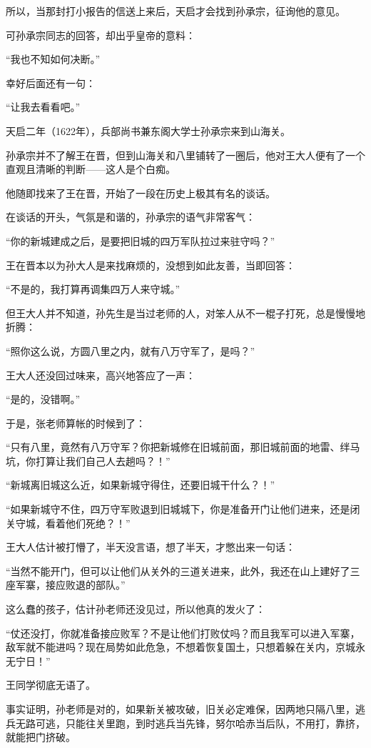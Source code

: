 \begin{multicols}{\theparacolNo}
		所以，当那封打小报告的信送上来后，天启才会找到孙承宗，征询他的意见。

		可孙承宗同志的回答，却出乎皇帝的意料：

		“我也不知如何决断。”

		幸好后面还有一句：

		“让我去看看吧。”

		天启二年（1622年），兵部尚书兼东阁大学士孙承宗来到山海关。

		孙承宗并不了解王在晋，但到山海关和八里铺转了一圈后，他对王大人便有了一个直观且清晰的判断——这人是个白痴。

		他随即找来了王在晋，开始了一段在历史上极其有名的谈话。

		在谈话的开头，气氛是和谐的，孙承宗的语气非常客气：

		“你的新城建成之后，是要把旧城的四万军队拉过来驻守吗？”

		王在晋本以为孙大人是来找麻烦的，没想到如此友善，当即回答：

		“不是的，我打算再调集四万人来守城。”

		但王大人并不知道，孙先生是当过老师的人，对笨人从不一棍子打死，总是慢慢地折腾：

		“照你这么说，方圆八里之内，就有八万守军了，是吗？”

		王大人还没回过味来，高兴地答应了一声：

		“是的，没错啊。”

		于是，张老师算帐的时候到了：

		“只有八里，竟然有八万守军？你把新城修在旧城前面，那旧城前面的地雷、绊马坑，你打算让我们自己人去趟吗？！”

		“新城离旧城这么近，如果新城守得住，还要旧城干什么？！”

		“如果新城守不住，四万守军败退到旧城城下，你是准备开门让他们进来，还是闭关守城，看着他们死绝？！”

		王大人估计被打懵了，半天没言语，想了半天，才憋出来一句话：

		“当然不能开门，但可以让他们从关外的三道关进来，此外，我还在山上建好了三座军寨，接应败退的部队。”

		这么蠢的孩子，估计孙老师还没见过，所以他真的发火了：

		“仗还没打，你就准备接应败军？不是让他们打败仗吗？而且我军可以进入军寨，敌军就不能进吗？现在局势如此危急，不想着恢复国土，只想着躲在关内，京城永无宁日！”

		王同学彻底无语了。

		事实证明，孙老师是对的，如果新关被攻破，旧关必定难保，因两地只隔八里，逃兵无路可逃，只能往关里跑，到时逃兵当先锋，努尔哈赤当后队，不用打，靠挤，就能把门挤破。


\end{multicols}
